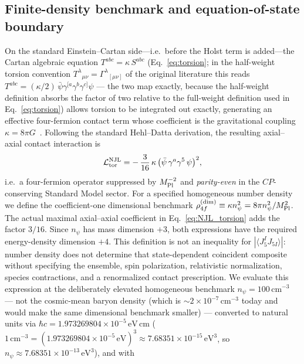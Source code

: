 \documentclass[aps,prd,twocolumn,superscriptaddress,showpacs,preprintnumbers,nofootinbib,longbibliography,floatfix]{revtex4-2}
\begin{document}
\subsection{Finite-density benchmark and equation-of-state boundary}
\label{sec:r1_njl}
On the standard Einstein--Cartan side---i.e.\ before the Holst term is
added---the Cartan algebraic equation $T^{abc} = \kappa\,S^{abc}$
(Eq.~\eqref{eq:torsion}; in the half-weight torsion convention
$T^\lambda{}_{\mu\nu} = \Gamma^\lambda{}_{[\mu\nu]}$ of the original
literature this reads $T^{abc} = (\kappa/2)\,
\bar\psi \gamma^{[a}\gamma^b\gamma^{c]} \psi$ --- the two map exactly,
because the half-weight definition absorbs the factor of two relative to the
full-weight definition used in Eq.~\eqref{eq:torsion}) allows torsion to
be integrated out exactly, generating an effective four-fermion
contact term whose coefficient is the gravitational coupling
$\kappa = 8\pi G$~\cite{Hehl1976,HehlDattaNJL1971}. Following the standard
Hehl--Datta derivation, the resulting axial--axial contact interaction is
\begin{equation}
\mathcal{L}^{\rm NJL}_{\rm tor}
= -\,\frac{3}{16}\,\kappa\,\bigl(\bar\psi\,\gamma^a\gamma^5\,\psi\bigr)^2,
\label{eq:NJL_torsion}
\end{equation}
i.e.\ a four-fermion operator suppressed by $M_{\rm Pl}^{-2}$ and
\emph{parity-even} in the $C\!P$-conserving Standard Model sector. For a
specified homogeneous number density we define the coefficient-one
dimensional benchmark
$\rho_{4f}^{(\mathrm{dim})}\equiv\kappa n_\psi^2
=8\pi n_\psi^2/M_{\rm Pl}^2$.
The actual maximal axial--axial coefficient in Eq.~\eqref{eq:NJL_torsion}
adds the factor $3/16$.  Since $n_\psi$ has mass dimension $+3$, both
expressions have the required energy-density dimension $+4$.
This definition is not an inequality for
$|\langle J_5^I J_{5I}\rangle|$: number density does not determine that
state-dependent coincident composite without specifying the ensemble, spin
polarization, relativistic normalization, species contractions, and a
renormalized contact prescription.
We evaluate this expression at the deliberately elevated homogeneous benchmark
$n_\psi=100\,\text{cm}^{-3}$ --- not the
cosmic-mean baryon density (which is $\sim\!2\times 10^{-7}\,\text{cm}^{-3}$
today and would make the same dimensional benchmark smaller) --- converted to
natural units via $\hbar c = 1.973269804\times 10^{-5}\,\text{eV}\,\text{cm}$
($1\,\text{cm}^{-3} = (1.973269804\times 10^{-5}\,\text{eV})^3
\approx 7.68351\times10^{-15}\,\text{eV}^3$, so
$n_\psi\approx 7.68351\times10^{-13}\,\text{eV}^3$), and with
\end{document}
